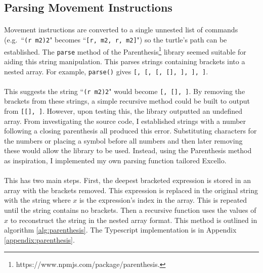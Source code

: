 \subsection{Parsing Movement Instructions}

\paragraph{} Movement instructions are converted to a single unnested list of commands (e.g.~``\texttt{(r m2)2}" becomes ``\texttt{[r, m2, r, m2]}") so the turtle's path can be established. The \texttt{parse} method of the Parenthesis\footnote{https://www.npmjs.com/package/parenthesis.} library seemed suitable for aiding this string manipulation. This parses strings containing brackets into a nested array. For example, \texttt{parse(\textcolor[rgb]{0,0.7,0}{})} gives \texttt{[\textcolor[rgb]{0,0.7,0}{}, [\textcolor[rgb]{0,0.7,0}{\upquote{b[}}, [\textcolor[rgb]{0,0.7,0}{}, [\textcolor[rgb]{0,0.7,0}{}], \textcolor[rgb]{0,0.7,0}{\upquote{\}}}], \textcolor[rgb]{0,0.7,0}{\upquote{]}}], \textcolor[rgb]{0,0.7,0}{\upquote{)}}]}.

\paragraph{} This suggests the string ``\texttt{(r m2)2}" would become \texttt{[\upquote{(}, [], ]}.  By removing the brackets from these strings, a simple recursive method could be built to output \texttt{} from \texttt{[[], ]}. However, upon testing this, the library outputted an undefined array. From investigating the source code, I established strings with a number following a closing parenthesis all produced this error. Substituting characters for the numbers or placing a symbol before all numbers and then later removing these would allow the library to be used. Instead, using the Parenthesis method as inspiration, I implemented my own parsing function tailored Excello.

\paragraph{} This has two main steps. First, the deepest bracketed expression is stored in an array with the brackets removed. This expression is replaced in the original string with the string  where $x$ is the expression's index in the array. This is repeated until the string contains no brackets. Then a recursive function uses the values of $x$ to reconstruct the string in the nested array format. This method is outlined in algorithm \ref{alg:parenthesis}. The Typescript implementation is in Appendix \ref{appendix:parenthesis}.

